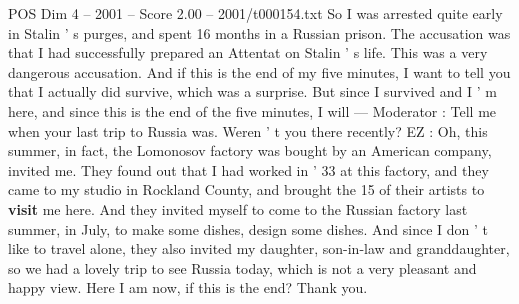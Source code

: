 \begin{textsample}{POS Dim 4 – 2001 – Score 2.00 – 2001/t000154.txt}
So I was arrested quite early in Stalin ' s purges, and spent 16 months in a Russian prison.
The accusation was that I had successfully prepared an Attentat on Stalin ' s life.
This was a very dangerous accusation.
And if this is the end of my five minutes, I want to tell you that I actually did survive, which was a surprise.
But since I survived and I ' m here, and since this is the end of the five minutes, I will — Moderator : Tell me when your last trip to Russia was.
Weren ' t you there recently?
EZ : Oh, this summer, in fact, the Lomonosov factory was bought by an American company, invited me.
They found out that I had worked in ' 33 at this factory, and they came to my studio in Rockland County, and brought the 15 of their artists to \textbf{visit} me here.
And they invited myself to come to the Russian factory last summer, in July, to make some dishes, design some dishes.
And since I don ' t like to travel alone, they also invited my daughter, son-in-law and granddaughter, so we had a lovely trip to see Russia today, which is not a very pleasant and happy view.
Here I am now, if this is the end?
Thank you.

\end{textsample}
